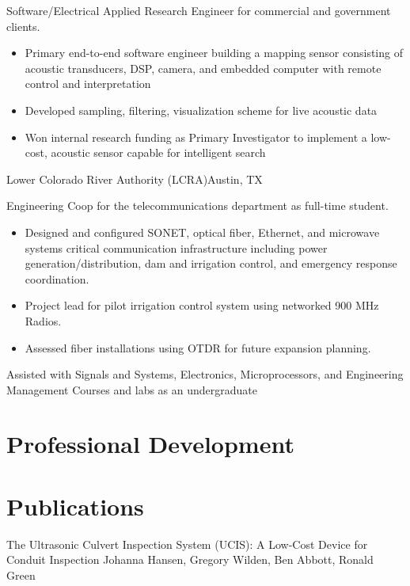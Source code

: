 \documentclass[11pt,a4paper,sans]{moderncv}
\begin{document}
{}{
Software/Electrical Applied Research Engineer for commercial and government clients.  
     \begin{itemize}
        \item Primary end-to-end software engineer building a mapping sensor consisting of acoustic transducers, DSP, camera, and embedded computer with remote control and interpretation 
        \item Developed sampling, filtering, visualization scheme for live acoustic data 
        \item Won internal research funding as Primary Investigator to 
            implement a low-cost, acoustic sensor capable for intelligent search 
    \end{itemize}
         }
            {Lower Colorado River Authority (LCRA)}{Austin, TX}{}
            {Engineering Coop for the telecommunications department 
            as full-time student.
 \begin{itemize}
        \item Designed and configured SONET, optical fiber, Ethernet, and microwave systems
            critical communication infrastructure including power generation/distribution, dam and 
            irrigation control, and emergency response coordination. 
        \item Project lead for pilot irrigation control system using networked
            900 MHz Radios. 
        \item Assessed fiber installations using OTDR for future expansion planning.
    \end{itemize}
}

{Assisted with Signals and Systems, Electronics, Microprocessors, and 
Engineering Management Courses and labs as an undergraduate}


\section{Professional Development}

\section{Publications}
        {The Ultrasonic Culvert Inspection System (UCIS): 
        A Low-Cost Device for Conduit Inspection}{}{}{}{}{}
        {Johanna Hansen, Gregory Wilden, Ben Abbott, Ronald Green}{}{}{}
\end{document}
